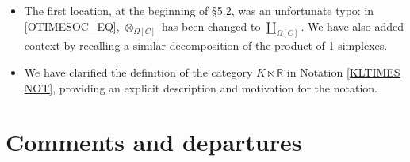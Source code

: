 \documentclass{article}
\begin{document}
\begin{itemize}
\item The first location, at the beginning of \S 5.2, was an unfortunate typo: %
      in \eqref{OTIMESOC_EQ}, $\otimes_{\Omega[C]}$ has been changed to $\coprod_{\Omega[C]}$.
      We have also added context by recalling a similar decomposition of the product of 1-simplexes.

\item
      We have clarified the definition of the category $K \ltimes \mathbb R$ in Notation \ref{KLTIMES NOT},
      providing an explicit description and motivation for the notation.
\end{itemize}

      

\section{Comments and departures} %
\end{document}
